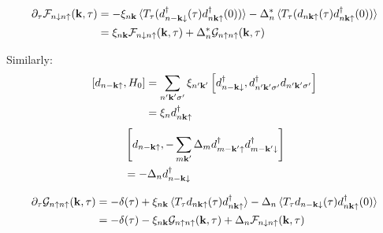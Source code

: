 \documentclass[../main.tex]{subfiles}
\begin{document}
\begin{align}
    \pdif{\tau} \mathcal{F}_{n\downarrow n\uparrow} (\vb{k}, \tau) &=
    -\xi_{n \vb{k}} \braket{T_{\tau} (d_{n -\vb{k} \downarrow}^{\dagger} (\tau) d_{n \vb{k} \uparrow}^{\dagger} (0))} - \Delta_n^* \braket{T_{\tau} (d_{n \vb{k} \uparrow} (\tau) d_{n \vb{k} \uparrow}^{\dagger} (0))} \\
    &= \xi_{n \vb{k}} \mathcal{F}_{n \downarrow n \uparrow} (\vb{k}, \tau) + \Delta_{n}^* \mathcal{G}_{n\uparrow n\uparrow} (\vb{k}, \tau)
\end{align}

Similarly:
\begin{align}
    \left[ d_{n -\bm{\mathrm{k}} \uparrow}, H_0 \right]
    &= \sum_{n^{\prime} \bm{\mathrm{k}}^{\prime} \sigma^{\prime}} \xi_{n^{\prime} \bm{\mathrm{k}}^{\prime}} \left[ d_{n -\bm{\mathrm{k}} \downarrow}^{\dagger}, d_{n^{\prime} \bm{\mathrm{k}}^{\prime} \sigma^{\prime}}^{\dagger} d_{n^{\prime} \bm{\mathrm{k}}^{\prime} \sigma^{\prime}} \right] \\
    &= \xi_{n} d_{n \bm{\mathrm{k}} \uparrow}^{\dagger}
\end{align}
\begin{align}
    &\left[d_{n -\bm{\mathrm{k}} \uparrow}, -\sum_{m \bm{\mathrm{k}}^{\prime}} \Delta_{m} d_{m -\bm{\mathrm{k}}^{\prime} \uparrow}^{\dagger} d_{m -\bm{\mathrm{k}}^{\prime} \downarrow}^{\dagger} \right] \\
    &= - \Delta_n d_{n -\bm{\mathrm{k}} \downarrow}^{\dagger}
\end{align}

\begin{align}
    \pdif{\tau} \mathcal{G}_{n \uparrow n \uparrow} (\vb{k}, \tau) &=
    -\delta(\tau) + \xi_{n \vb{k}} \braket{T_{\tau} d_{n \vb{k} \uparrow} (\tau) d_{n \vb{k} \uparrow}^{\dagger}} - \Delta_n \braket{T_{\tau} d_{n -\vb{k} \downarrow} (\tau) d_{n \vb{k} \uparrow}^{\dagger} (0)} \\
    &= -\delta(\tau) - \xi_{n \vb{k}} \mathcal{G}_{n \uparrow n \uparrow} (\vb{k}, \tau) + \Delta_{n} \mathcal{F}_{n\downarrow n\uparrow} (\vb{k}, \tau) \\
\end{align}
\end{document}
